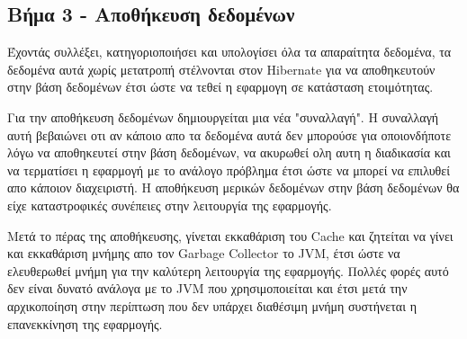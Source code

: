 \subsection{Βήμα 3 - Αποθήκευση δεδομένων}
Έχοντάς συλλέξει, κατηγοριοποιήσει και υπολογίσει όλα τα απαραίτητα δεδομένα, τα δεδομένα αυτά χωρίς μετατροπή στέλνονται στον Hibernate για να αποθηκευτούν στην βάση δεδομένων έτσι ώστε να τεθεί η εφαρμογη σε κατάσταση ετοιμότητας. 

Για την αποθήκευση δεδομένων δημιουργείται μια νέα "συναλλαγή". Η συναλλαγή αυτή βεβαιώνει οτι αν κάποιο απο τα δεδομένα αυτά δεν μπορούσε για οποιονδήποτε λόγω να αποθηκευτεί στην βάση δεδομένων, να ακυρωθεί ολη αυτη η διαδικασία και να τερματίσει η εφαρμογή με το ανάλογο πρόβλημα έτσι ώστε να μπορεί να επιλυθεί απο κάποιον διαχειριστή. Η αποθήκευση μερικών δεδομένων στην βάση δεδομένων θα είχε καταστροφικές συνέπειες στην λειτουργία της εφαρμογής. 

Μετά το πέρας της αποθήκευσης, γίνεται εκκαθάριση του Cache και ζητείται να γίνει και εκκαθάριση μνήμης απο τον Garbage Collector το JVM, έτσι ώστε να ελευθερωθεί μνήμη για την καλύτερη λειτουργία της εφαρμογής. Πολλές φορές αυτό δεν είναι δυνατό ανάλογα με το JVM που χρησιμοποιείται και έτσι μετά την αρχικοποίηση στην περίπτωση που δεν υπάρχει διαθέσιμη μνήμη συστήνεται η επανεκκίνηση της εφαρμογής.

